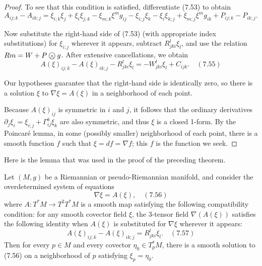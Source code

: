 \begin{proof}
To see that this condition is satisfied, differentiate (7.53) to obtain
$$A_{ij;k} - A_{ik;j} = \xi_{i;k}\xi_j + \xi_i \xi_{j;k} - \xi_{m;k}\xi^m g_{ij} - \xi_{i;j}\xi_k - \xi_i \xi_{k;j} + \xi_{m;j}\xi^m g_{ik} + P_{ij;k} - P_{ik;j}.$$

Now substitute the right-hand side of (7.53) (with appropriate index substitutions) for $\xi_{i;j}$ wherever it appears, subtract $R_{jki}^l \xi_l$, and use the relation $Rm = W + P \owedge g$. After extensive cancellations, we obtain
$$A(\xi)_{ij;k} - A(\xi)_{ik;j} - R_{jki}^l \xi_l = -W_{jki}^l \xi_l + C_{ijk}. \quad (7.55)$$

Our hypotheses guarantee that the right-hand side is identically zero, so there is a solution $\xi$ to $\nabla\xi = A(\xi)$ in a neighborhood of each point.

Because $A(\xi)_{ij}$ is symmetric in $i$ and $j$, it follows that the ordinary derivatives $\partial_j\xi_i = \xi_{i;j} + \Gamma_{ij}^k\xi_k$ are also symmetric, and thus $\xi$ is a closed 1-form. By the Poincar\'e lemma, in some (possibly smaller) neighborhood of each point, there is a smooth function $f$ such that $\xi = df = \nabla f$; this $f$ is the function we seek.
\end{proof}

Here is the lemma that was used in the proof of the preceding theorem.

\begin{lemma}
\label{lem:overdetermined-covector-system}
Let $(M, g)$ be a Riemannian or pseudo-Riemannian manifold, and consider the overdetermined system of equations
$$\nabla\xi = A(\xi), \quad (7.56)$$
where $A : T^*M \to T^2T^*M$ is a smooth map satisfying the following compatibility condition: for any smooth covector field $\xi$, the 3-tensor field $\nabla(A(\xi))$ satisfies the following identity when $A(\xi)$ is substituted for $\nabla\xi$ wherever it appears:
$$A(\xi)_{ij;k} - A(\xi)_{ik;j} = R_{jki}^l \xi_l. \quad (7.57)$$
Then for every $p \in M$ and every covector $\eta_0 \in T_p^*M$, there is a smooth solution to (7.56) on a neighborhood of $p$ satisfying $\xi_p = \eta_0$.
\end{lemma}

